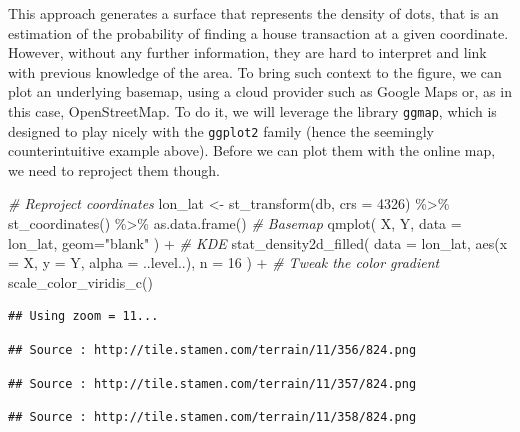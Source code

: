 \documentclass[
]{book}
\newenvironment{Shaded}{\begin{snugshade}}{\end{snugshade}}
\newcommand{\AttributeTok}[1]{\textcolor[rgb]{0.77,0.63,0.00}{#1}}
\newcommand{\CommentTok}[1]{\textcolor[rgb]{0.56,0.35,0.01}{\textit{#1}}}
\newcommand{\DecValTok}[1]{\textcolor[rgb]{0.00,0.00,0.81}{#1}}
\newcommand{\FunctionTok}[1]{\textcolor[rgb]{0.00,0.00,0.00}{#1}}
\newcommand{\NormalTok}[1]{#1}
\newcommand{\OtherTok}[1]{\textcolor[rgb]{0.56,0.35,0.01}{#1}}
\newcommand{\SpecialCharTok}[1]{\textcolor[rgb]{0.00,0.00,0.00}{#1}}
\newcommand{\StringTok}[1]{\textcolor[rgb]{0.31,0.60,0.02}{#1}}
\begin{document}
This approach generates a surface that represents the density of dots, that is an estimation of the probability of finding a house transaction at a given coordinate. However, without any further information, they are hard to interpret and link with previous knowledge of the area. To bring such context to the figure, we can plot an underlying basemap, using a cloud provider such as Google Maps or, as in this case, OpenStreetMap. To do it, we will leverage the library \texttt{ggmap}, which is designed to play nicely with the \texttt{ggplot2} family (hence the seemingly counterintuitive example above). Before we can plot them with the online map, we need to reproject them though.

\begin{Shaded}
\begin{Highlighting}[]
\CommentTok{\# Reproject coordinates}
\NormalTok{lon\_lat }\OtherTok{\textless{}{-}} \FunctionTok{st\_transform}\NormalTok{(db, }\AttributeTok{crs =} \DecValTok{4326}\NormalTok{) }\SpecialCharTok{\%\textgreater{}\%}
  \FunctionTok{st\_coordinates}\NormalTok{() }\SpecialCharTok{\%\textgreater{}\%}
  \FunctionTok{as.data.frame}\NormalTok{()}
\CommentTok{\# Basemap}
\FunctionTok{qmplot}\NormalTok{(}
\NormalTok{  X, }
\NormalTok{  Y, }
  \AttributeTok{data =}\NormalTok{ lon\_lat, }
  \AttributeTok{geom=}\StringTok{"blank"}
\NormalTok{) }\SpecialCharTok{+}
  \CommentTok{\# KDE}
  \FunctionTok{stat\_density2d\_filled}\NormalTok{(}
    \AttributeTok{data =}\NormalTok{ lon\_lat, }
    \FunctionTok{aes}\NormalTok{(}\AttributeTok{x =}\NormalTok{ X, }\AttributeTok{y =}\NormalTok{ Y, }\AttributeTok{alpha =}\NormalTok{ ..level..),}
    \AttributeTok{n =} \DecValTok{16}
\NormalTok{  ) }\SpecialCharTok{+}
  \CommentTok{\# Tweak the color gradient}
  \FunctionTok{scale\_color\_viridis\_c}\NormalTok{()}
\end{Highlighting}
\end{Shaded}

\begin{verbatim}
## Using zoom = 11...
\end{verbatim}

\begin{verbatim}
## Source : http://tile.stamen.com/terrain/11/356/824.png
\end{verbatim}

\begin{verbatim}
## Source : http://tile.stamen.com/terrain/11/357/824.png
\end{verbatim}

\begin{verbatim}
## Source : http://tile.stamen.com/terrain/11/358/824.png
\end{verbatim}
\end{document}
